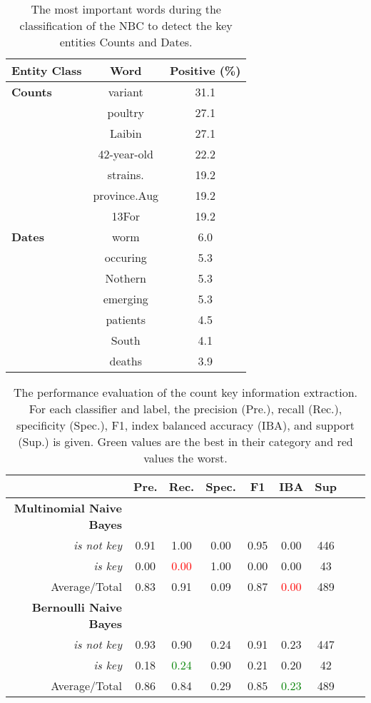   \begin{table}
    \centering
    \caption{The most important words during the classification of the NBC to detect the key entities Counts and Dates.}
    \begin{tabular}{@{}lcc@{}}
      \toprule
      \textbf{Entity Class}& \textbf{Word} & \textbf{Positive (\%)}\\
      \midrule
      \textbf{Counts}& variant& 31.1\\
      & poultry& 27.1\\
      & Laibin& 27.1\\
      & 42-year-old& 22.2\\
      & strains.& 19.2\\
      & province.Aug& 19.2\\
      & 13For& 19.2\vspace{2mm}\\
      \textbf{Dates}
      & worm& 6.0\\
      & occuring& 5.3\\
      & Nothern& 5.3\\
      & emerging& 5.3\\
      & patients& 4.5\\
      & South& 4.1\\
      & deaths& 3.9\\
      \bottomrule
    \end{tabular}
  \label{table:important_words}
  \end{table}

  \begin{table}
    \caption{The performance evaluation of the count key information extraction. For each classifier and label, the precision (Pre.), recall (Rec.), specificity (Spec.), F1, index balanced accuracy (IBA), and support (Sup.) is given. Green values are the best in their category and red values the worst.}
    \centering
    \begin{tabular}{@{}rcccccccc@{}}
      \toprule
       & \textbf{Pre.} & \textbf{Rec.} & \textbf{Spec.}
      & \textbf{F1} &  \textbf{IBA}& \textbf{Sup} \\
      \midrule
      \textbf{Multinomial Naive Bayes}\\
      \textsl{is not key}& 0.91& 1.00&  0.00& 0.95& 0.00& 446 \\
      \textsl{is key}& 0.00& \textcolor{red}{0.00}&  1.00& 0.00& 0.00& 43 \\
      Average/Total& 0.83& 0.91& 0.09& 0.87& \textcolor{red}{0.00}& 489 \vspace{2mm}\\
      \textbf{Bernoulli Naive Bayes}\\
      \textsl{is not key}& 0.93& 0.90&  0.24& 0.91& 0.23& 447 \\
      \textsl{is key}& 0.18& \textcolor{green}{0.24}&  0.90& 0.21& 0.20& 42 \\
      Average/Total& 0.86& 0.84& 0.29& 0.85& \textcolor{green}{0.23}& 489 \vspace{2mm}\\
      \bottomrule
    \end{tabular}
  \label{table:keyword_performance_counts}
  \end{table}

